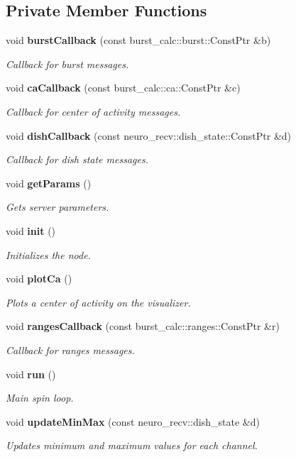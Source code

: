 \subsection*{\-Private \-Member \-Functions}
\begin{DoxyCompactItemize}
\item 
void {\bf burst\-Callback} (const burst\-\_\-calc\-::burst\-::\-Const\-Ptr \&b)
\begin{DoxyCompactList}\small\item\em \-Callback for burst messages. \end{DoxyCompactList}\item 
void {\bf ca\-Callback} (const burst\-\_\-calc\-::ca\-::\-Const\-Ptr \&c)
\begin{DoxyCompactList}\small\item\em \-Callback for center of activity messages. \end{DoxyCompactList}\item 
void {\bf dish\-Callback} (const neuro\-\_\-recv\-::dish\-\_\-state\-::\-Const\-Ptr \&d)
\begin{DoxyCompactList}\small\item\em \-Callback for dish state messages. \end{DoxyCompactList}\item 
void {\bf get\-Params} ()
\begin{DoxyCompactList}\small\item\em \-Gets server parameters. \end{DoxyCompactList}\item 
void {\bf init} ()
\begin{DoxyCompactList}\small\item\em \-Initializes the node. \end{DoxyCompactList}\item 
void {\bf plot\-Ca} ()
\begin{DoxyCompactList}\small\item\em \-Plots a center of activity on the visualizer. \end{DoxyCompactList}\item 
void {\bf ranges\-Callback} (const burst\-\_\-calc\-::ranges\-::\-Const\-Ptr \&r)
\begin{DoxyCompactList}\small\item\em \-Callback for ranges messages. \end{DoxyCompactList}\item 
void {\bf run} ()
\begin{DoxyCompactList}\small\item\em \-Main spin loop. \end{DoxyCompactList}\item 
void {\bf update\-Min\-Max} (const neuro\-\_\-recv\-::dish\-\_\-state \&d)
\begin{DoxyCompactList}\small\item\em \-Updates minimum and maximum values for each channel. \end{DoxyCompactList}\end{DoxyCompactItemize}
